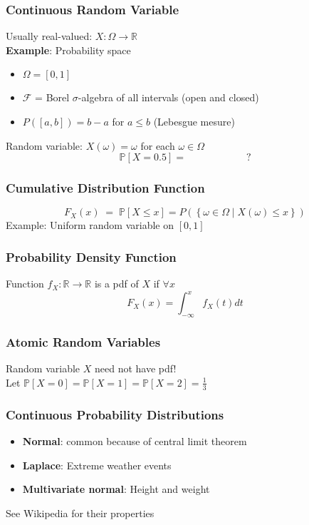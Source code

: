 \documentclass{beamer}
\newcommand{\Real}{\mathbb{R}}
\renewcommand{\P}[1]{\mathbb{P}\left[#1\right]}
\begin{document}
\begin{frame} \frametitle{Continuous Random Variable}
  Usually real-valued: $X\colon \Omega \to \Real$ \\
  \vfill 
  \textbf{Example}: Probability space
  \begin{itemize}
  \item $\Omega = [0,1]$
  \item $\mathcal{F}$ = Borel $\sigma$-algebra of all intervals (open and closed)
  \item $P([a,b]) = b-a$ for $a \le  b$ (Lebesgue mesure)
  \end{itemize}
  \vfill 
  Random variable: $X(\omega) = \omega$ for each $\omega\in \Omega$ \\
  \vfill
  \[
   \P{X = 0.5} = \qquad  \qquad \qquad ? 
  \]
\end{frame}

\begin{frame} \frametitle{Cumulative Distribution Function}
  \[
    F_X(x) \; =\;  \P{X \le x} = 
    P \left( \left\{ \omega \in  \Omega \mid X(\omega) \le x \right\} \right)
  \]
  Example: Uniform random variable on $[0,1]$
  \vspace{5cm}
\end{frame}

\begin{frame} \frametitle{Probability Density Function}
  Function $f_X\colon \Real \to \Real$ is a pdf of $X$ if $\forall x$
  \[
   F_X(x)  = \int_{-\infty}^x f_X(t) dt 
 \]
 \vspace{4cm}
\end{frame}

\begin{frame} \frametitle{Atomic Random Variables}
  Random variable $X$ need not have pdf! \\
  Let $\P{X = 0} = \P{X = 1} = \P{X = 2} = \frac{1}{3}$\\
  \vspace{5cm}
\end{frame}

\begin{frame}\frametitle{Continuous Probability Distributions} 
    \begin{itemize}
    \item \textbf{Normal}: common because of central limit theorem
    \item \textbf{Laplace}: Extreme weather events
    \item \textbf{Multivariate normal}: Height and weight
    \end{itemize}
  {\small See Wikipedia for their properties}
\end{frame}
\end{document}
